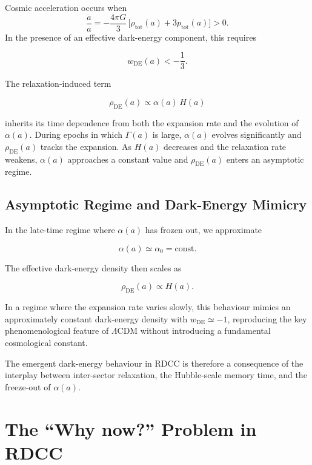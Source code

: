 \documentclass[11pt,a4paper]{article}
\newcommand{\Ha}{H(a)}
\newcommand{\GammaR}{\Gamma}
\newcommand{\alphaR}{\alpha}
\begin{document}
Cosmic acceleration occurs when
\begin{equation}
\frac{\ddot{a}}{a}
    = -\frac{4\pi G}{3}\,\big[\rho_{\mathrm{tot}}(a)
        + 3p_{\mathrm{tot}}(a)\big] > 0.
\end{equation}
In the presence of an effective dark-energy component, this requires


\[
w_{\mathrm{DE}}(a) < -\frac{1}{3}.
\]



The relaxation-induced term


\[
\rho_{\mathrm{DE}}(a) \propto \alphaR(a)\,\Ha
\]


inherits its time dependence from both the expansion rate and the evolution of
$\alphaR(a)$. During epochs in which $\GammaR(a)$ is large, $\alphaR(a)$ evolves
significantly and $\rho_{\mathrm{DE}}(a)$ tracks the expansion. As $\Ha$
decreases and the relaxation rate weakens, $\alphaR(a)$ approaches a constant
value and $\rho_{\mathrm{DE}}(a)$ enters an asymptotic regime.

\subsection{Asymptotic Regime and Dark-Energy Mimicry}

In the late-time regime where $\alphaR(a)$ has frozen out, we approximate


\[
\alphaR(a) \simeq \alpha_{0} = \mathrm{const}.
\]


The effective dark-energy density then scales as


\[
\rho_{\mathrm{DE}}(a) \propto \Ha.
\]


In a regime where the expansion rate varies slowly, this behaviour mimics an
approximately constant dark-energy density with $w_{\mathrm{DE}} \simeq -1$,
reproducing the key phenomenological feature of $\Lambda$CDM without introducing
a fundamental cosmological constant.

The emergent dark-energy behaviour in RDCC is therefore a consequence of the
interplay between inter-sector relaxation, the Hubble-scale memory time, and the
freeze-out of $\alphaR(a)$.


\section{The ``Why now?'' Problem in RDCC}
\end{document}

